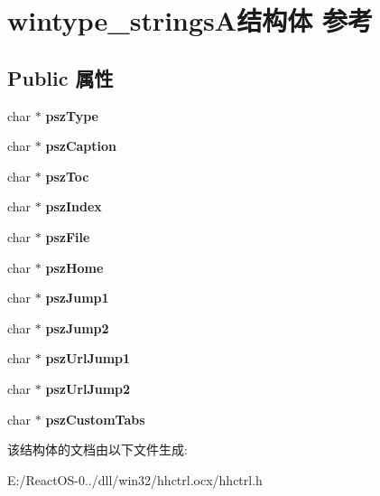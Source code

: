\hypertarget{structwintype__strings_a}{}\section{wintype\+\_\+strings\+A结构体 参考}
\label{structwintype__strings_a}
\subsection*{Public 属性}
\begin{DoxyCompactItemize}
\item 
\mbox{\label{structwintype__strings_a_a41c4173075236d27f4d9ba3c9d4fe330}} 
char $\ast$ {\bfseries psz\+Type}
\item 
\mbox{\label{structwintype__strings_a_acdc12db7d3b21b4d52718d3df7384459}} 
char $\ast$ {\bfseries psz\+Caption}
\item 
\mbox{\label{structwintype__strings_a_a0c9a547187ff5eb2111ef3b775374c64}} 
char $\ast$ {\bfseries psz\+Toc}
\item 
\mbox{\label{structwintype__strings_a_a63eadec7325c73dc297a6facdb3f0d33}} 
char $\ast$ {\bfseries psz\+Index}
\item 
\mbox{\label{structwintype__strings_a_ad0c0192a8d18784aeeb1e905ed43a0a6}} 
char $\ast$ {\bfseries psz\+File}
\item 
\mbox{\label{structwintype__strings_a_a1e0029dd19cf6a8df47aa66e16bc7569}} 
char $\ast$ {\bfseries psz\+Home}
\item 
\mbox{\label{structwintype__strings_a_a7b8395341fe6f02d8b0f7899ff9ef552}} 
char $\ast$ {\bfseries psz\+Jump1}
\item 
\mbox{\label{structwintype__strings_a_ac0bade1bc4552195bd2a0fd78a5d39ec}} 
char $\ast$ {\bfseries psz\+Jump2}
\item 
\mbox{\label{structwintype__strings_a_a851b56c7f8fe3ddcc62f88e4a7a3bbfc}} 
char $\ast$ {\bfseries psz\+Url\+Jump1}
\item 
\mbox{\label{structwintype__strings_a_a615f50f34150ce1c8620d41ccf6a263a}} 
char $\ast$ {\bfseries psz\+Url\+Jump2}
\item 
\mbox{\label{structwintype__strings_a_a11d3ffc793c15ca904c7822228c036df}} 
char $\ast$ {\bfseries psz\+Custom\+Tabs}
\end{DoxyCompactItemize}


该结构体的文档由以下文件生成\+:\begin{DoxyCompactItemize}
\item 
E\+:/\+React\+O\+S-\/0../dll/win32/hhctrl.\+ocx/hhctrl.\+h\end{DoxyCompactItemize}
